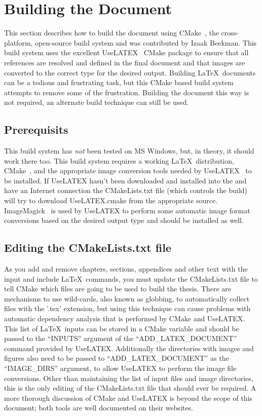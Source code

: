 \chapter{Building the Document\label{ch:building}}

This section describes how to build the document using CMake~\cite{CMake}, the
cross-platform, open-source build system and was contributed by Izaak
Beekman. This build system uses the excellent UseLATEX~\cite{UseLATEX}
CMake package to ensure that all references are resolved and defined
in the final document and that images are converted to the correct
type for the desired output. Building \LaTeX\  documents can be a
tedious and frustrating task, but this CMake based build system
attempts to remove some of the frustration. Building the
document this way is not required, an alternate build technique can
still be used.

\section{Prerequisits}
\label{sec:building:prerequisits}

This build system has \emph{not} been tested on MS Windows, but, in
theory, it should work there too. This build system requires a
working \LaTeX\  distribution, CMake~\cite{CMake}, and the appropriate
image conversion tools needed by UseLATEX~\cite{UseLATEX} to be installed.
If UseLATEX hasn't been downloaded and installed into the and have an Internet connection the
CMakeLists.txt file (which controls the build) will try to download
UseLATEX.cmake from the appropriate
source. ImageMagick~\cite{ImageMagick} is used by UseLATEX to perform
some automatic image format conversions based on the desired output
type and should be installed as well.

\section{Editing the CMakeLists.txt file}
\label{sec:building:cmakelists}

As you add and remove chapters, sections, appendices and other text
with the input and include \LaTeX\  commands, you must update the
CMakeLists.txt file to tell CMake which files are going to be used to
build the thesis. There are mechanisms to use wild-cards, also known
as globbing, to automatically collect files with the '.tex' extension,
but using this technique can cause problems with automatic dependency
analysis that is performed by CMake and UseLATEX. This list of \LaTeX\
inputs can be stored in a CMake variable and should be passed to the
``INPUTS'' argument of the ``ADD\_LATEX\_DOCUMENT'' command provided
by UseLATEX. Additionally the directories with images and figures also
need to be passed to ``ADD\_LATEX\_DOCUMENT'' as the ``IMAGE\_DIRS''
argument, to allow UseLATEX to perform the image file
conversions. Other than maintaining the list of input files and image
directories, this is the only editing of the CMakeLists.txt file that
should ever be required. A more thorough discussion of CMake and
UseLATEX is beyond the scope of this document; both tools are well
documented on their websites.

